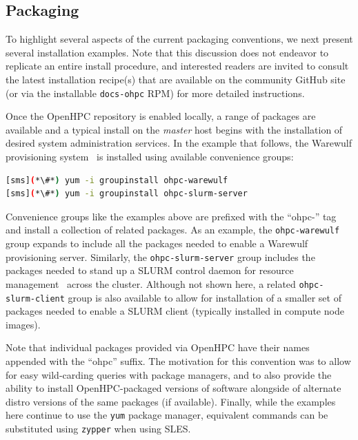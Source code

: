 \documentclass{sig-alternate-05-2015}
\begin{document}
\subsection{Packaging} \label{sec:packaging}

To highlight several aspects of the current packaging conventions, we next
present several installation examples. Note that this
discussion does not endeavor to replicate an entire install procedure, and
interested readers are invited to consult the latest installation recipe(s) that
are available on the community GitHub site (or via the installable
\texttt{docs-ohpc} RPM) for more detailed instructions.

Once the OpenHPC repository is enabled locally, a range of packages are
available and a typical install on the {\em master} host begins with the
installation of desired system administration services. In the example that
follows, the Warewulf provisioning system~\cite{warewulf_url} is installed using
available convenience groups:

\begin{lstlisting}[language=bash,keywords={}]
[sms](*\#*) yum -i groupinstall ohpc-warewulf
[sms](*\#*) yum -i groupinstall ohpc-slurm-server
\end{lstlisting}
  
Convenience groups like the examples above are prefixed with the ``ohpc-'' tag
and install a collection of related packages. As an example, the
\texttt{ohpc-warewulf} group expands to include all the packages needed to
enable a Warewulf provisioning server. Similarly, the
\texttt{ohpc-slurm-server} group includes the packages needed to stand up a
SLURM control daemon for resource management~\cite{Jette02slurm:simple} across
the cluster.  Although not shown here, a related \texttt{ohpc-slurm-client}
group is also available to allow for installation of a smaller set of packages
needed to enable a SLURM client (typically installed in compute node images).

Note that individual packages provided via OpenHPC have their names appended
with the ``ohpc'' suffix.  The motivation for this convention was to allow for
easy wild-carding queries with package managers, and to also provide the
ability to install OpenHPC-packaged versions of software alongside of alternate
distro versions of the same packages (if available).  Finally, while the
examples here continue to use the \texttt{yum} package manager, equivalent
commands can be substituted using \texttt{zypper} when using SLES.  \\
\end{document}
